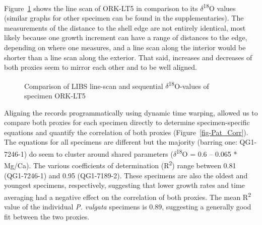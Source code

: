 \documentclass[
  authoryear,
  preprint,
  3p]{elsarticle}
\begin{document}
Figure~\ref{fig-Pat_Comp} shows the line scan of ORK-LT5 in comparison
to its \(\delta\)\textsuperscript{18}O values (similar graphs for other
specimen can be found in the supplementaries). The measurements of the
distance to the shell edge are not entirely identical, most likely
because one growth increment can have a range of distances to the edge,
depending on where one measures, and a line scan along the interior
would be shorter than a line scan along the exterior. That said,
increases and decreases of both proxies seem to mirror each other and to
be well aligned.

\begin{figure}


\caption{\label{fig-Pat_Comp}Comparison of LIBS line-scan and sequential
\(\delta\)\textsuperscript{18}O-values of specimen ORK-LT5}

\end{figure}%

Aligning the records programmatically using dynamic time warping,
allowed us to compare both proxies for each specimen directly to
determine specimen-specific equations and quantify the correlation of
both proxies (Figure~\ref{fig-Pat_Corr}). The equations for all
specimens are different but the majority (barring one: QG1-7246-1) do
seem to cluster around shared parameters
(\(\delta\)\textsuperscript{18}Ο = 0.6 -- 0.065 * Mg/Ca). The various
coefficients of determination (R\textsuperscript{2}) range between 0.81
(QG1-7246-1) and 0.95 (QG1-7189-2). These specimens are also the oldest
and youngest specimens, respectively, suggesting that lower growth rates
and time averaging had a negative effect on the correlation of both
proxies. The mean R\textsuperscript{2} value of the individual \emph{P.
vulgata} specimens is 0.89, suggesting a generally good fit between the
two proxies.
\end{document}
